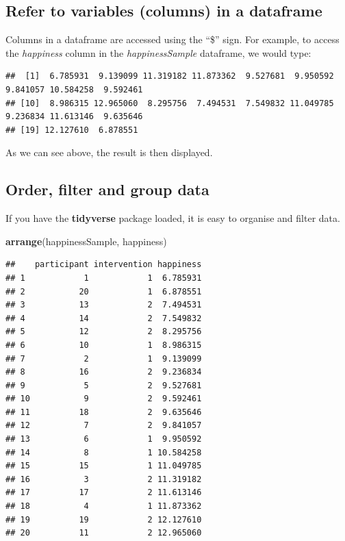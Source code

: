 \documentclass[
]{book}
\newenvironment{Shaded}{\begin{snugshade}}{\end{snugshade}}
\newcommand{\KeywordTok}[1]{\textcolor[rgb]{0.13,0.29,0.53}{\textbf{#1}}}
\newcommand{\NormalTok}[1]{#1}
\newcommand{\OperatorTok}[1]{\textcolor[rgb]{0.81,0.36,0.00}{\textbf{#1}}}
\begin{document}
\hypertarget{refer-to-variables-columns-in-a-dataframe}{%
\subsection{Refer to variables (columns) in a dataframe}\label{refer-to-variables-columns-in-a-dataframe}}

Columns in a dataframe are accessed using the ``\$'' sign. For example, to access the \emph{happiness} column in the \emph{happinessSample} dataframe, we would type:

\begin{Shaded}
\end{Shaded}

\begin{verbatim}
##  [1]  6.785931  9.139099 11.319182 11.873362  9.527681  9.950592  9.841057 10.584258  9.592461
## [10]  8.986315 12.965060  8.295756  7.494531  7.549832 11.049785  9.236834 11.613146  9.635646
## [19] 12.127610  6.878551
\end{verbatim}

As we can see above, the result is then displayed.

\hypertarget{order-filter-and-group-data}{%
\subsection{Order, filter and group data}\label{order-filter-and-group-data}}

If you have the \textbf{tidyverse} package loaded, it is easy to organise and filter data.

\begin{Shaded}
\begin{Highlighting}[]
\KeywordTok{arrange}\NormalTok{(happinessSample, happiness)}
\end{Highlighting}
\end{Shaded}

\begin{verbatim}
##    participant intervention happiness
## 1            1            1  6.785931
## 2           20            1  6.878551
## 3           13            2  7.494531
## 4           14            2  7.549832
## 5           12            2  8.295756
## 6           10            1  8.986315
## 7            2            1  9.139099
## 8           16            2  9.236834
## 9            5            2  9.527681
## 10           9            2  9.592461
## 11          18            2  9.635646
## 12           7            2  9.841057
## 13           6            1  9.950592
## 14           8            1 10.584258
## 15          15            1 11.049785
## 16           3            2 11.319182
## 17          17            2 11.613146
## 18           4            1 11.873362
## 19          19            2 12.127610
## 20          11            2 12.965060
\end{verbatim}
\end{document}
